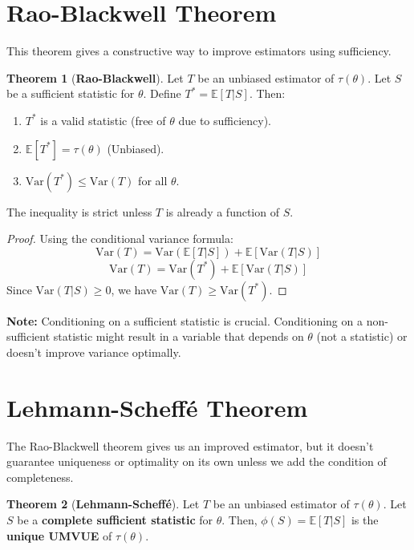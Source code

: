 \documentclass[12pt, a4paper]{article}
\theoremstyle{definition}
\newtheorem{theorem}{Theorem}
\newcommand{\E}{\mathbb{E}}
\newcommand{\Var}{\text{Var}}
\begin{document}
\section{Rao-Blackwell Theorem}

This theorem gives a constructive way to improve estimators using sufficiency.

\begin{theorem}[\textbf{Rao-Blackwell}]
Let $T$ be an unbiased estimator of $\tau(\theta)$. Let $S$ be a sufficient statistic for $\theta$.
Define $T^* = \E[T | S]$. Then:
\begin{enumerate}
    \item $T^*$ is a valid statistic (free of $\theta$ due to sufficiency).
    \item $\E[T^*] = \tau(\theta)$ (Unbiased).
    \item $\Var(T^*) \le \Var(T)$ for all $\theta$.
\end{enumerate}
The inequality is strict unless $T$ is already a function of $S$.
\end{theorem}

\begin{proof}
Using the conditional variance formula:
$$ \Var(T) = \Var(\E[T|S]) + \E[\Var(T|S)] $$
$$ \Var(T) = \Var(T^*) + \E[\Var(T|S)] $$
Since $\Var(T|S) \ge 0$, we have $\Var(T) \ge \Var(T^*)$.
\end{proof}

\textbf{Note:} Conditioning on a sufficient statistic is crucial. Conditioning on a non-sufficient statistic might result in a variable that depends on $\theta$ (not a statistic) or doesn't improve variance optimally.

\section{Lehmann-Scheffé Theorem}

The Rao-Blackwell theorem gives us an improved estimator, but it doesn't guarantee uniqueness or optimality on its own unless we add the condition of completeness.

\begin{theorem}[\textbf{Lehmann-Scheffé}]
Let $T$ be an unbiased estimator of $\tau(\theta)$. Let $S$ be a \textbf{complete sufficient statistic} for $\theta$.
Then, $\phi(S) = \E[T | S]$ is the \textbf{unique UMVUE} of $\tau(\theta)$.
\end{theorem}
\end{document}

